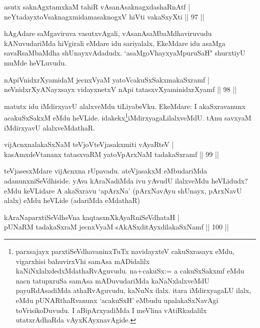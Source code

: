 \begin{shl}
asutx saknAgxtamxkaM tahiR vAsanAsaknagxdashaRnAtf |\\
neYtadayxtoV\s saknagxmidamasaknogxV hiVti vakaSxyXti \hfill || 97 ||
\end{shl}

\begin{artha}
hAgAdare saMgaviruva vasutxvAgali, vAsanAsaMbaMdhaviruvudu kANuvudariMda hiVgirali eMdare idu sariyalalx, EkeMdare idu asaMga savaRsaMbaMdha shUnayxvAdadudx. `asaMgoVhayxyaMpuruSaH" shurxtiyU muMde heVLuvudu.
\end{artha}

\begin{shl}
nApiVnidxrXyamidaM jecnxVyaM yatoV\s cakuSxSakxmakaSxramf |\\
neVnidxrXyANayxsayx vidayxnetxV nApi tatasxvXyaminidxrXyamf \hfill || 98 ||
\end{shl}

\begin{artha}
matutx idu iMdirxyavU alalxveMdu tiLiyabeVku. EkeMdare: I akaSxravanunx acakuSxSakxM eMdu heVLide. idakekx\footnote{parxsajayx parxtiSeVdhavaninxTuTx navidayxteV cakuSxrasayx eMdu, vigarxhisi bahuvirxVhi samAsa mADidalilx kaNiNxlalxdedxMdathaRvAguvudu. na+cakuSx:= a cakuSxSakxmf eMdu nacn tatupxruSa samAsa mADuvudariMda kaNaNxlalxveMdU payuRdAsadiMda athaRvAguvudu, kaNuNx ilalx. itara iMdirxyagaLU ilalx, eMdu pUNARthaRvanunx `acakuSxH' eMbudu upalakaSxNavAgi toVrisikoDuvudu. I aBipArxyadiMda I meVlina vAtiRkadalilx utatxrAdhaRda vAyxKAyxnavAgide.}iMdirxyagaLilalxveMdU. tAnu savxyaM iMdirxyavU alalxveMdathaR.
\end{artha}

\begin{shl}
vijAcnxnalakaSxNaM teVjoV\s teVjasakxmiti vAyaRteV |\\
kasAmxdeVtananx tatasxvaRM yatoV\s pArxNaM tadakaSxramf \hfill || 99 ||
\end{shl}

\begin{artha}%
teVjasesxMdare vijAcnxna rUpavadu. ateVjasakxM eMbudariMda adanunx\break niSeVdhiside. yAva kAraNadiMda ivu yAvudU ilalxveMdu heVLidudx? eMdu keVLidare A akaSxravu `apArxNa' (pArxNavAyu shUnayx, pArxNavU alalx) eMdu heVLide (adariMda eMdathaR)
\end{artha}


\begin{shl}
kAraNaparxtiSeVdheVna kaqtasxnXkAyaRniSeVdhataH |\\
pUNaRM tadakaSxraM jecnxVyaM sAkASxditAyxdilakaSxNamf \hfill || 100 ||
\end{shl}

